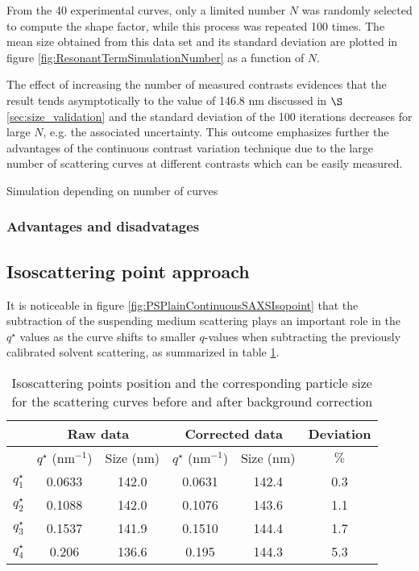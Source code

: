 From the 40 experimental curves, only a limited number $N$ was randomly selected to compute the shape factor, while this process was repeated 100 times. The mean size obtained from this data set and its standard deviation are plotted in figure \ref{fig:ResonantTermSimulationNumber} as a function of $N$.

The effect of increasing the number of measured contrasts evidences that the result tends asymptotically to the value of 146.8 nm discussed in $\S$\ref{sec:size_validation} and the standard deviation of the 100 iterations decreases for large $N$, e.g. the associated uncertainty. This outcome emphasizes further the advantages of the continuous contrast variation technique due to the large number of scattering curves at different contrasts which can be easily measured.

Simulation depending on number of curves
\subsubsection{Advantages and disadvatages}
\subsection{Isoscattering point approach}
It is noticeable in figure \ref{fig:PSPlainContinuousSAXSIsopoint} that the subtraction of the suspending medium scattering plays an important role in the $q^{\star}$ values as the curve shifts to smaller $q$-values when subtracting the previously calibrated solvent scattering, as summarized in table \ref{tab:isoscattering_points}. 

\begin{table}
	\centering
	\begin{tabular}{l||cc|cc|c}
		 & \multicolumn{2}{c}{Raw data} & \multicolumn{2}{c}{Corrected data} & Deviation\\
		 \hline
		 & \( q^{\star} \) (nm\(^{-1}\))    &  Size (nm) & \( q^{\star}\) (nm\(^{-1}\))    &  Size (nm) & $\%$ \\
		\hline
		 \(q^{\star}_1\) &  0.0633 & 142.0 &  0.0631 & 142.4 & 0.3 \\
		 \(q^{\star}_2\) &  0.1088 & 142.0 &  0.1076 & 143.6 & 1.1   \\
		 \(q^{\star}_3\) &  0.1537 & 141.9 &  0.1510 & 144.4 & 1.7    \\
		 \(q^{\star}_4\) &  0.206  & 136.6 &  0.195  & 144.3 & 5.3     \\
		\end{tabular}
	\caption{Isoscattering points position and the corresponding particle size for the scattering curves before and after background correction}
	\label{tab:isoscattering_points}
\end{table}


